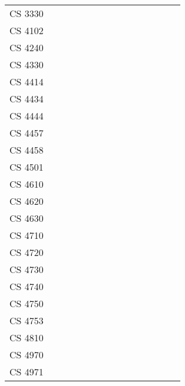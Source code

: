 {\begin{tabular}{l|cccccccccccccc}
CS 3330 & \X & \X & \X & \X & \X & \X & \X & \X & \X &    & \X & \X & \X \\
CS 4102 & \X &    & \X & \X & \X & \X & \X & \X & \X & \X & \X & \X & \X \\
CS 4240 &    &    & \X &    & \X &    & \X &    & \X &    & \X &    & \X \\
CS 4330 &    & \X &    &    &    &    &    &    &    &    &    &    &    \\
CS 4414 & \X & \X & \X & \X & \X & \X & \X & \X & \X & \X & \X & \X & \X \\
CS 4434 &    &    &    & \X &    &    &    & \X &    &    &    &    &    \\
CS 4444 & \X &    & \X &    & \X &    & \X &    &    & \X &    &    &    \\
CS 4457 & \X & \X & \X & \X & \X & \X & \X & \X & \X & \X & \X &    & \X \\
CS 4458 & \X &    &    &    &    &    &    &    &    &    &    &    &    \\
CS 4501 &    &    &    &    & \X & \X &    &    & \X & \X &    & \X & \X \\
CS 4610 &    &    & \X &    &    &    &    & \X &    &    &    & \X &    \\
CS 4620 &    &    &    &    &    &    &    &    &    &    & \X &    & \X \\
CS 4630 &    & \X & \X & \X &    & \X &    & \X &    & \X & \X & \X &    \\
CS 4710 &    & \X &    &    &    & \X &    & \X &    & \X &    & \X &    \\
CS 4720 &    &    & \X &    & \X &    & \X &    & \X &    & \X & \X & \X \\
CS 4730 &    &    &    & \X &    &    & \X &    &    &    &    & \X &    \\
CS 4740 &    &    &    &    &    &    &    & \X &    & \X &    &    &    \\
CS 4750 & \X &    &    & \X &    & \X &    & \X &    & \X &    & \X &    \\
CS 4753 & \X &    & \X &    & \X &    & \X &    & \X &    & \X &    & \X \\
CS 4810 & \X &    &    & \X &    &    & \X &    & \X &    &    & \X & \X \\
CS 4970 &    &    &    &    &    &    &    & \X & \X &    & \X &    & \X \\
CS 4971 &    &    &    &    &    &    &    &    &    & \X &    & \X &    \\
\end{tabular}
}

